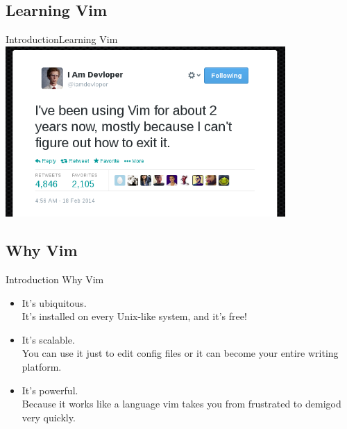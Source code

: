 \documentclass{beamer}
\begin{document}
\subsection{Learning Vim}
\begin{frame}[c]{Introduction}{Learning Vim}
    \centering
    \includegraphics[width=0.8\textwidth]{learningVim}
\end{frame}

\subsection{Why Vim}
\begin{frame} {Introduction} {Why Vim}
    \begin{itemize}
        \item It's ubiquitous. \\It's installed on every Unix-like system, and it's free!\\
        \item It's scalable. \\You can use it just to edit config files or it can become your entire writing platform. \\
        \item It's powerful. \\Because it works like a language vim takes you from frustrated to demigod very quickly. \\
    \end{itemize}
\end{frame}
\end{document}
